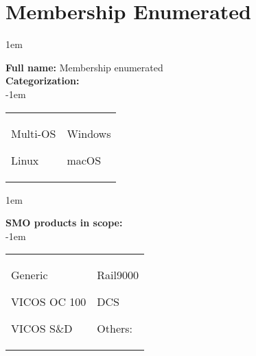 
%
%

\section{Membership Enumerated}

\openup 1em

\textbf{Full name:} Membership enumerated\hrulefill \\
{\bf Categorization:} \\

\openup -1em
\vspace{-3em}

\begin{tabular}{p{}p{}}

\begin{todolist}
  	\item Multi-OS
	\item Linux
\end{todolist}
&
\begin{todolist}
	\item[\done] Windows
	\item macOS
\end{todolist}

\end{tabular}

\openup 1em

{\bf SMO products in scope:} \\

\openup -1em
\vspace{-3em}

\begin{tabular}{p{}p{}}

\begin{todolist}
  \item[\done] Generic
  \item VICOS OC 100
  \item VICOS S\&D
\end{todolist}
&
\begin{todolist}
  \item Rail9000
  \item DCS
  \item Others: \hrulefill
\end{todolist}

\end{tabular}

